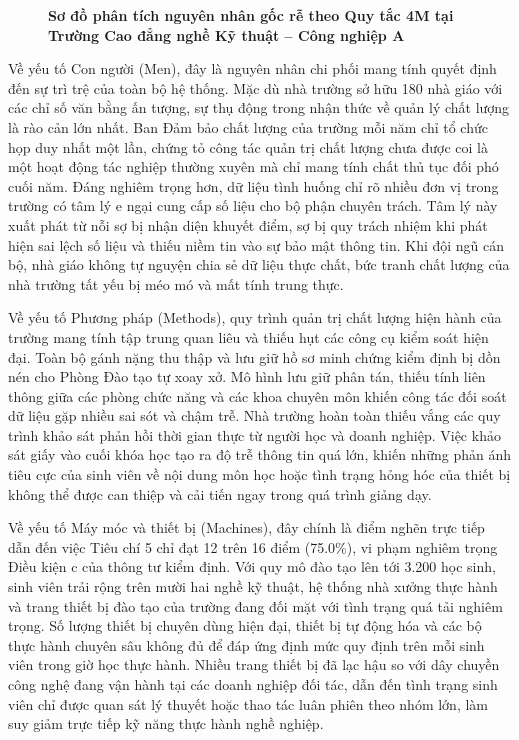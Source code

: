 \begin{figure}[htbp]
\caption{\textbf{Sơ đồ phân tích nguyên nhân gốc rễ theo Quy tắc 4M tại Trường Cao đẳng nghề Kỹ thuật -- Công nghiệp A}}
\label{fig:so_do_4m}
\end{figure}

Về yếu tố Con người (Men), đây là nguyên nhân chi phối mang tính quyết định đến sự trì trệ của toàn bộ hệ thống. Mặc dù nhà trường sở hữu 180 nhà giáo với các chỉ số văn bằng ấn tượng, sự thụ động trong nhận thức về quản lý chất lượng là rào cản lớn nhất. Ban Đảm bảo chất lượng của trường mỗi năm chỉ tổ chức họp duy nhất một lần, chứng tỏ công tác quản trị chất lượng chưa được coi là một hoạt động tác nghiệp thường xuyên mà chỉ mang tính chất thủ tục đối phó cuối năm. Đáng nghiêm trọng hơn, dữ liệu tình huống chỉ rõ nhiều đơn vị trong trường có tâm lý e ngại cung cấp số liệu cho bộ phận chuyên trách. Tâm lý này xuất phát từ nỗi sợ bị nhận diện khuyết điểm, sợ bị quy trách nhiệm khi phát hiện sai lệch số liệu và thiếu niềm tin vào sự bảo mật thông tin. Khi đội ngũ cán bộ, nhà giáo không tự nguyện chia sẻ dữ liệu thực chất, bức tranh chất lượng của nhà trường tất yếu bị méo mó và mất tính trung thực.

Về yếu tố Phương pháp (Methods), quy trình quản trị chất lượng hiện hành của trường mang tính tập trung quan liêu và thiếu hụt các công cụ kiểm soát hiện đại. Toàn bộ gánh nặng thu thập và lưu giữ hồ sơ minh chứng kiểm định bị dồn nén cho Phòng Đào tạo tự xoay xở. Mô hình lưu giữ phân tán, thiếu tính liên thông giữa các phòng chức năng và các khoa chuyên môn khiến công tác đối soát dữ liệu gặp nhiều sai sót và chậm trễ. Nhà trường hoàn toàn thiếu vắng các quy trình khảo sát phản hồi thời gian thực từ người học và doanh nghiệp. Việc khảo sát giấy vào cuối khóa học tạo ra độ trễ thông tin quá lớn, khiến những phản ánh tiêu cực của sinh viên về nội dung môn học hoặc tình trạng hỏng hóc của thiết bị không thể được can thiệp và cải tiến ngay trong quá trình giảng dạy.

Về yếu tố Máy móc và thiết bị (Machines), đây chính là điểm nghẽn trực tiếp dẫn đến việc Tiêu chí 5 chỉ đạt 12 trên 16 điểm (75.0\%), vi phạm nghiêm trọng Điều kiện c của thông tư kiểm định. Với quy mô đào tạo lên tới 3.200 học sinh, sinh viên trải rộng trên mười hai nghề kỹ thuật, hệ thống nhà xưởng thực hành và trang thiết bị đào tạo của trường đang đối mặt với tình trạng quá tải nghiêm trọng. Số lượng thiết bị chuyên dùng hiện đại, thiết bị tự động hóa và các bộ thực hành chuyên sâu không đủ để đáp ứng định mức quy định trên mỗi sinh viên trong giờ học thực hành. Nhiều trang thiết bị đã lạc hậu so với dây chuyền công nghệ đang vận hành tại các doanh nghiệp đối tác, dẫn đến tình trạng sinh viên chỉ được quan sát lý thuyết hoặc thao tác luân phiên theo nhóm lớn, làm suy giảm trực tiếp kỹ năng thực hành nghề nghiệp.

